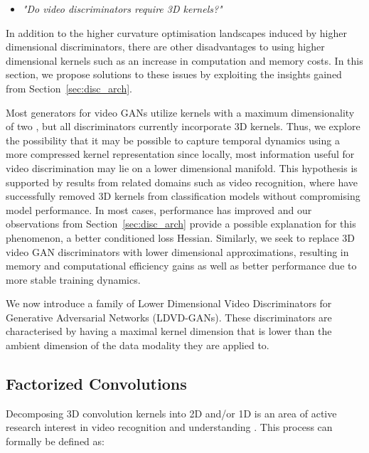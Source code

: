 \documentclass[a4paper,fleqn]{cas-sc}
\begin{document}
\begin{itemize}
    \item \textit{"Do video discriminators require 3D kernels?"}
\end{itemize}

In addition to the higher curvature optimisation landscapes induced by higher dimensional discriminators, there are other disadvantages to using higher dimensional kernels such as an increase in computation and memory costs. In this section, we propose solutions to these issues by exploiting the insights gained from Section~\ref{sec:disc_arch}.


Most generators for video GANs utilize kernels with a maximum dimensionality of two \cite{SaitoMS17temporal,Tulyakov0YK18mocogan, saito2018tganv2}, but all discriminators currently incorporate 3D kernels.  Thus, we explore the possibility that it may be possible to capture temporal dynamics using a more compressed kernel representation since locally, most information useful for video discrimination may lie on a lower dimensional manifold. This hypothesis is supported by results from related domains such as video recognition, where \cite{TranWTRLP18r2plus1d,FeichtenhoferPW16spatiotemporal,SunJYS15factorized,QiuYM17pseudo3D,XieSHTM18rethinking,linGHtsm} have successfully removed 3D kernels from classification models without compromising model performance. In most cases, performance has improved and our observations from Section~\ref{sec:disc_arch} provide a possible explanation for this phenomenon, a better conditioned loss Hessian. Similarly, we seek to replace 3D video GAN discriminators with lower dimensional approximations, resulting in memory and computational efficiency gains as well as better performance due to more stable training dynamics.

We now introduce a family of Lower Dimensional Video Discriminators for Generative Adversarial Networks (LDVD-GANs). These discriminators are characterised by having a maximal kernel dimension that is lower than the ambient dimension of the data modality they are applied to.

\subsection{Factorized Convolutions}
\label{sec:factorized_conv}
Decomposing 3D convolution kernels into 2D and/or 1D is an area of active research interest in video recognition and understanding \cite{TranWTRLP18r2plus1d,FeichtenhoferPW16spatiotemporal,SunJYS15factorized,QiuYM17pseudo3D,XieSHTM18rethinking}. This process can formally be defined as: 
\end{document}
